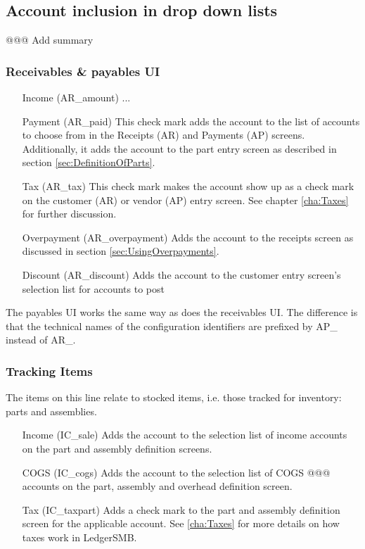 \documentclass[10pt,A4]{book}
\begin{document}
\subsection{Account inclusion in drop down lists}

@@@ Add summary

\subsubsection{Receivables \& payables UI}

\begin{itemize}
\item[Income (AR\_amount)] ...
\item[Payment (AR\_paid)] This check mark adds the account to the list of accounts
   to choose from in the Receipts (AR) and Payments (AP) screens. Additionally, it
   adds the account to the part entry screen as described in section \ref{sec:DefinitionOfParts}.
\item[Tax (AR\_tax)] This check mark makes the account show up as a check mark on the
   customer (AR) or vendor (AP) entry screen. See chapter \ref{cha:Taxes} for further discussion.
\item[Overpayment (AR\_overpayment)] Adds the account to the receipts screen as discussed
   in section \ref{sec:UsingOverpayments}.
\item[Discount (AR\_discount)] Adds the account to the customer entry screen's selection
   list for accounts to post 
\end{itemize}

The payables UI works the same way as does the receivables UI. The difference is
that the technical names of the configuration identifiers are prefixed by AP\_ instead
of AR\_.

\subsubsection{Tracking Items}

The items on this line relate to stocked items, i.e. those tracked for inventory: parts and
assemblies.

\begin{enumerate}
\item[Income (IC\_sale)] Adds the account to the selection list of income accounts on the
   part and assembly definition screens.
\item[COGS (IC\_cogs)] Adds the account to the selection list of COGS @@@ accounts on the
   part, assembly and overhead definition screen.
\item[Tax (IC\_taxpart)] Adds a check mark to the part and assembly definition screen
   for the applicable account. See \ref{cha:Taxes} for more details on how taxes
   work in LedgerSMB.
\end{enumerate}
\end{document}
